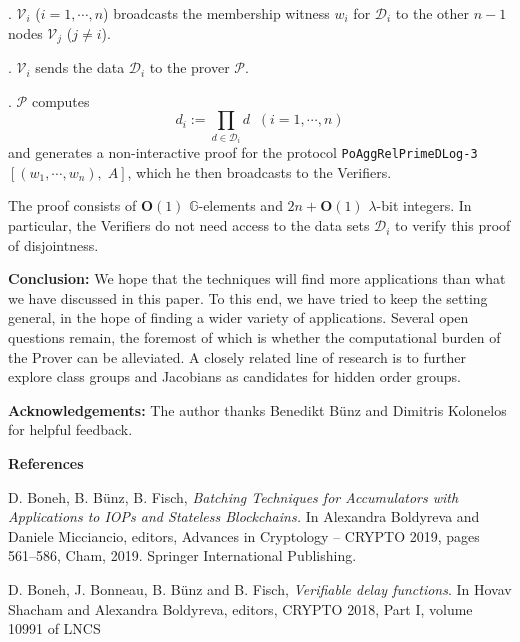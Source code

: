 \documentclass[11pt, lettersize, notitlepage, leqno, footskip=0.6cm]{article}
\newcommand{\pl}{\prod\limits}
\newcommand{\bG}{\mathbb{G}}
\newcommand{\mc}{\mathcal}
\newcommand{\mbf}{\mathbf}
\newcommand{\lam}{\lambda}
\newcommand{\bO}{\mbf{O}}
\newcommand{\mP}{\mc{P}}
\newcommand{\V}{\mc{V}}
\newcommand{\vs}{\vspace{-0.15cm}}
\newcommand{\noin}{\noindent}
\numberwithin{equation}{section}
\begin{document}
\noin 1. $\V_i$ ($i=1,\cdots,n$) broadcasts the membership witness $w_i$ for $\mc{D}_i$ to the other $n-1$ nodes $\V_j$ ($j\neq i$). 

\noin 2. $\V_i$ sends the data $\mc{D}_i$ to the prover $\mP$.

\noin 3. $\mP$ computes \vs $$d_i:= \pl_{d\in\mc{D}_i} d\;\;(i=1,\cdots,n)$$ and generates a non-interactive proof for the protocol \verb|PoAggRelPrimeDLog-3|$[(w_1,\cdots,w_n),\; A]$, which he then broadcasts to the Verifiers.

The proof consists of $\bO(1)$ $\bG$-elements and $2n+\bO(1)$ $\lam$-bit integers. In particular, the Verifiers do not need access to the data sets $\mc{D}_i$ to verify this proof of disjointness.




\bigskip


\bigskip

\noin \textbf{Conclusion:} We hope that the techniques will find more applications than what we have discussed in this paper. To this end, we have tried to keep the setting general, in the hope of finding a wider variety of applications.  Several open questions remain, the foremost of which is whether the computational burden of the Prover can be alleviated. A closely related line of research is to further explore class groups and Jacobians as candidates for hidden order groups.




\bigskip

\noin \textbf{Acknowledgements:} The author thanks Benedikt B\"{u}nz and Dimitris Kolonelos for helpful feedback.

\bigskip



\begin{center}\textbf{References} \end{center}
\footnotesize

\noindent [BBF19] D. Boneh, B. B\"{u}nz, B. Fisch, \textit{Batching Techniques for Accumulators with Applications to IOPs and Stateless Blockchains.} In Alexandra Boldyreva and Daniele Micciancio, editors, Advances in Cryptology – CRYPTO 2019, pages 561–586, Cham, 2019. Springer International Publishing. \vspace{0.1cm}

\noin [BBBF18] D. Boneh, J. Bonneau, B. B\"{u}nz and B. Fisch, \textit{Verifiable delay functions}. In Hovav Shacham and Alexandra Boldyreva, editors, CRYPTO 2018, Part I, volume 10991 of LNCS \vspace{0.1cm}
\end{document}
